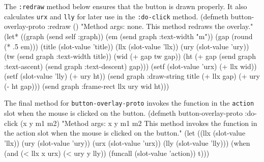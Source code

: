 The {\tt{}:redraw} method below ensures that the button is drawn
properly.  It also calculates {\tt{}urx} and {\tt{}lly} for later use in the
{\tt{}:do-click} method. 
\nwenddocs{}\plusendmoddef
(defmeth button-overlay-proto :redraw ()
  "Method args: none.
This method redraws the overlay."
  (let* ((graph (send self :graph))
         (em (send graph :text-width "m"))
         (gap (round (* .5 em)))
         (title (slot-value 'title))
         (llx (slot-value 'llx))
         (ury (slot-value 'ury))
         (tw (send graph :text-width title))
         (wid (+ gap tw gap))
         (ht (+ gap (send graph :text-ascent) (send graph :text-descent)
                gap)))
    (setf (slot-value 'urx) (+ llx wid))
    (setf (slot-value 'lly) (+ ury ht))
    (send graph :draw-string title (+ llx gap)  (+ ury (- ht gap)))
    (send graph :frame-rect llx ury wid ht)))
\eatline
{}\nwendcode{}\nwdocspar

The final method for {\tt{}button-overlay-proto} invokes the function in
the {\tt{}action} slot when the mouse is clicked on the button.
\nwenddocs{}\plusendmoddef
(defmeth button-overlay-proto :do-click (x y m1 m2)
  "Method args: x y m1 m2
This method invokes the function in the action slot when the mouse is
clicked on the button."
  (let ((llx (slot-value 'llx))
        (ury (slot-value 'ury))
        (urx (slot-value 'urx))
        (lly (slot-value 'lly)))
    (when (and (< llx x urx) (< ury y lly))
          (funcall (slot-value 'action))
          t)))
\eatline
{}\nwendcode{}\nwdocspar

